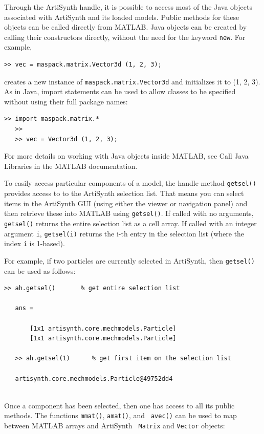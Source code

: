 \documentclass{article}
\begin{document}
Through the ArtiSynth handle, it is possible to access most of the
Java objects associated with ArtiSynth and its loaded models.  Public
methods for these objects can be called directly from MATLAB. 
Java objects can be created by calling their constructors
directly, without the need for the keyword {\tt new}.
For example, 
%
\begin{lstlisting}[]
   >> vec = maspack.matrix.Vector3d (1, 2, 3);
\end{lstlisting}
%
creates a new instance of {\tt maspack.matrix.Vector3d} and
initializes it to (1, 2, 3). As in Java, import statements can be used
to allow classes to be specified without using their full package
names:
%
\begin{lstlisting}[]
   >> import maspack.matrix.*
   >>
   >> vec = Vector3d (1, 2, 3);
\end{lstlisting}
%
For more details on working with Java objects inside MATLAB, see {\sf
Call Java Libraries} in the MATLAB documentation.

To easily access particular components of a model, the handle method
{\tt getsel()} provides access to to the ArtiSynth selection
list. That means you can select items in the ArtiSynth GUI (using
either the viewer or navigation panel) and then retrieve these into
MATLAB using {\tt getsel()}. If called with no arguments, {\tt
getsel()} returns the entire selection list as a cell array.  If
called with an integer argument {\tt i}, {\tt getsel(i)} returns the
i-th entry in the selection list (where the index {\tt i} is 1-based).

For example, if two particles are currently selected in ArtiSynth, then
{\tt getsel()} can be used as follows:
%
\begin{lstlisting}[]
   >> ah.getsel()       % get entire selection list
   
   ans = 

       [1x1 artisynth.core.mechmodels.Particle]
       [1x1 artisynth.core.mechmodels.Particle]

   >> ah.getsel(1)      % get first item on the selection list

   artisynth.core.mechmodels.Particle@49752dd4
   
\end{lstlisting}
%
Once a component has been selected, then one has access to all its
public methods. The functions {\tt mmat()}, {\tt amat()}, and {\tt
avec()} can be used to map between MATLAB arrays and ArtiSynth {\tt
Matrix} and {\tt Vector} objects:
\end{document}

